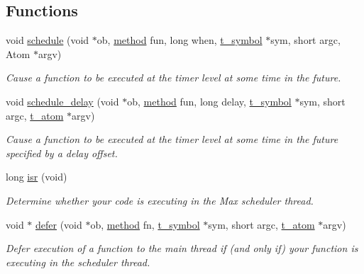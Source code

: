 \subsection*{Functions}
\begin{DoxyCompactItemize}
\item 
void \hyperlink{group__threading_ga1eb8ec7623f0806dd079d7be708c19a8}{schedule} (void $\ast$ob, \hyperlink{group__datatypes_gac26ba0a173b50597f5738132e059b42d}{method} fun, long when, \hyperlink{structt__symbol}{t\_\-symbol} $\ast$sym, short argc, Atom $\ast$argv)
\begin{DoxyCompactList}\small\item\em Cause a function to be executed at the timer level at some time in the future. \item\end{DoxyCompactList}\item 
void \hyperlink{group__threading_gaa9b66fe2fc601f110bd962a622f1d5a0}{schedule\_\-delay} (void $\ast$ob, \hyperlink{group__datatypes_gac26ba0a173b50597f5738132e059b42d}{method} fun, long delay, \hyperlink{structt__symbol}{t\_\-symbol} $\ast$sym, short argc, \hyperlink{structt__atom}{t\_\-atom} $\ast$argv)
\begin{DoxyCompactList}\small\item\em Cause a function to be executed at the timer level at some time in the future specified by a delay offset. \item\end{DoxyCompactList}\item 
long \hyperlink{group__threading_gad60dbceb5e50471a3ec76f608a9ea35c}{isr} (void)
\begin{DoxyCompactList}\small\item\em Determine whether your code is executing in the Max scheduler thread. \item\end{DoxyCompactList}\item 
void $\ast$ \hyperlink{group__threading_gaa24a0c9896f1ad241e45590065c3f643}{defer} (void $\ast$ob, \hyperlink{group__datatypes_gac26ba0a173b50597f5738132e059b42d}{method} fn, \hyperlink{structt__symbol}{t\_\-symbol} $\ast$sym, short argc, \hyperlink{structt__atom}{t\_\-atom} $\ast$argv)
\begin{DoxyCompactList}\small\item\em Defer execution of a function to the main thread if (and only if) your function is executing in the scheduler thread. \item\end{DoxyCompactList}\item 

\end{DoxyCompactItemize}
